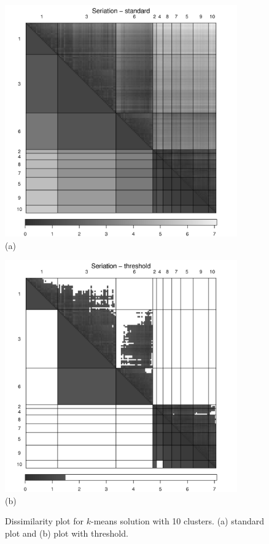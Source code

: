 \documentclass[fleqn, a4paper]{article}
\begin{document}
\begin{figure}
    \centering
    \includegraphics[width=10cm]{seriation-dissplot3}\\
    (a)
    
    \includegraphics[width=10cm]{seriation-dissplot4}\\
    (b)
    \caption{Dissimilarity plot for $k$-means solution with 10 clusters. 
    (a) standard plot and (b) plot with threshold.}
    \label{fig:dissplot3}
\end{figure}
\end{document}
